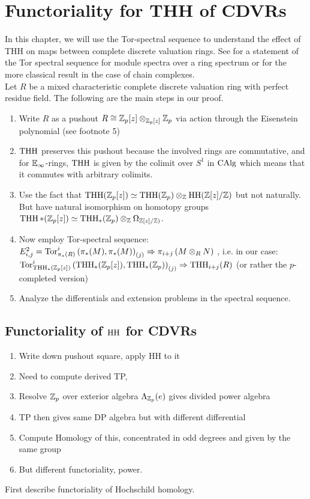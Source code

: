 \chapter{Functoriality for THH of CDVRs}
In this chapter, we will use the Tor-spectral sequence to understand the effect of THH on maps between complete discrete valuation rings.
See \cite[~Proposition 7.2.1.19]{lurie2017higher} for a statement of the Tor spectral sequence for module spectra over a ring spectrum 
or \cite[\href{https://stacks.math.columbia.edu/tag/061Y}{Tag 061Y}]{stacks-project} for the more classical result in the case of chain complexes.
\\
Let $R$ be a mixed characteristic complete discrete valuation ring with perfect residue field. The following are the main steps in our proof.
\begin{enumerate}
    \item Write $R$ as a pushout $R\cong\mathbb{Z}_p[z]\otimes_{\mathbb{Z}_p[z]}\mathbb{Z}_p$ via action through the Eisenstein polynomial (see footnote 5)
    \item $\operatorname{THH}$ preserves this pushout because the involved rings are commutative, and for $\mathbb{E}_\infty$-rings, $\operatorname{THH}$ is given by the colimit over $S^1$ in $\operatorname{CAlg}$ which means that it commutes with arbitrary colimits.
    \item Use the fact that $\operatorname{THH}(\mathbb{Z}_p[z])\simeq \operatorname{THH}(\mathbb{Z}_p)\otimes_{\mathbb{Z}} \operatorname{HH}(\mathbb{Z}[z]/\mathbb{Z})$ but not naturally. But have natural isomorphism on homotopy groups
    $\operatorname{THH}*(\mathbb{Z}_p[z])\simeq \operatorname{THH}_*(\mathbb{Z}_p)\otimes_{\mathbb{Z}} \Omega_{\mathbb{Z}[z]/\mathbb{Z})}$.
    \item Now employ Tor-spectral sequence:\\
     $E^2_{i,j}=\operatorname{Tor}_{\pi_*(R)}^i\left( \pi_*(M), \pi_*(M)\right)_{(j)}\Rightarrow \pi_{i+j}\left( M\otimes_R N \right)$
    , i.e. in our case: 
    \\
    $\operatorname{Tor}_{\operatorname{THH}_*(\mathbb{Z}_p[z])}^i\left( \operatorname{THH}_*(\mathbb{Z}_p[z]),\operatorname{THH}_*(\mathbb{Z}_p)\right)_{(j)}\Rightarrow \operatorname{THH}_{i+j}(R)$ (or rather the $p$-completed version)
    \item Analyze the differentials and extension problems in the spectral sequence.
\end{enumerate}
\section{Functoriality of $\operatorname{HH}$ for CDVRs}
\begin{enumerate}
    \item Write down pushout square, apply HH to it
    \item Need to compute derived TP, 
    \item Resolve $\mathbb{Z}_p$ over exterior algebra $\Lambda_{\mathbb{Z}_p}(e)$ gives divided power algebra
    \item TP then gives same DP algebra but with different differential
    \item Compute Homology of this, concentrated in odd degrees and given by the same group
    \item But different functoriality, power.
\end{enumerate}
First describe functoriality of Hochschild homology.
